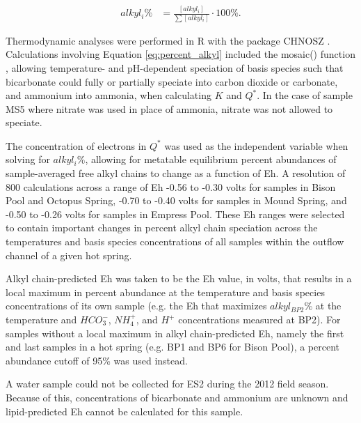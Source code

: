 \begin{equation} \label{eq:percent_alkyl}
\begin{split}
alkyl_{i}\% & = \frac{[alkyl_{i}]}{\sum{[alkyl_{i}]}} \cdot 100\%.
\end{split}
\end{equation}

Thermodynamic analyses were performed in R with the package CHNOSZ \citep{dick2008calculation}. Calculations involving Equation \ref{eq:percent_alkyl} included the mosaic() function \citep{dick2017equilibrium}, allowing temperature- and pH-dependent speciation of basis species such that bicarbonate could fully or partially speciate into carbon dioxide or carbonate, and ammonium into ammonia, when calculating $K$ and $Q^{*}$. In the case of sample MS5 where nitrate was used in place of ammonia, nitrate was not allowed to speciate.

The concentration of electrons in $Q^{*}$ was used as the independent variable when solving for $alkyl_{i}\%$, allowing for metatable equilibrium percent abundances of sample-averaged free alkyl chains to change as a function of Eh. A resolution of 800 calculations across a range of Eh -0.56 to -0.30 volts for samples in Bison Pool and Octopus Spring, -0.70 to -0.40 volts for samples in Mound Spring, and -0.50 to -0.26 volts for samples in Empress Pool. These Eh ranges were selected to contain important changes in percent alkyl chain speciation across the temperatures and basis species concentrations of all samples within the outflow channel of a given hot spring.

Alkyl chain-predicted Eh was taken to be the Eh value, in volts, that results in a local maximum in percent abundance at the temperature and basis species concentrations of its own sample (e.g. the Eh that maximizes $alkyl_{BP2}\%$ at the temperature and $HCO_{3}^{-}$, $NH_{4}^{+}$, and $H^{+}$ concentrations measured at BP2). For samples without a local maximum in alkyl chain-predicted Eh, namely the first and last samples in a hot spring (e.g. BP1 and BP6 for Bison Pool), a percent abundance cutoff of 95\% was used instead.

A water sample could not be collected for ES2 during the 2012 field season. Because of this, concentrations of bicarbonate and ammonium are unknown and lipid-predicted Eh cannot be calculated for this sample.

